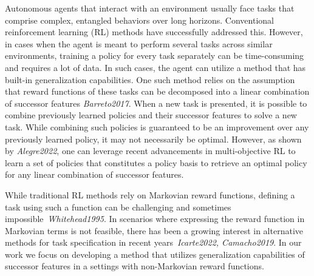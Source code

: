 Autonomous agents that interact with an environment usually face tasks  that comprise complex, entangled behaviors over long horizons. Conventional reinforcement learning (RL) methods have successfully addressed this.  However, in cases when the agent is meant to perform several tasks across similar environments, training a policy for every task separately can be time-consuming and requires a lot of data. In such cases, the agent can utilize a method that has built-in generalization capabilities. One such method relies on the assumption that reward functions of these tasks can be decomposed into a linear combination of successor features \textit{Barreto2017}. When a new task is presented, it is possible to combine previously learned policies and their successor features to solve a new task. %
While combining such policies is guaranteed to be an improvement over any previously learned policy, it may not necessarily be optimal. 
However, as shown by \textit{Alegre2022}, %
one can leverage recent advancements in multi-objective RL to learn a set of policies that constitutes a policy basis to retrieve an optimal policy for any linear combination of successor features. 

While traditional RL methods rely on Markovian reward functions, defining a task using such a function can be challenging and sometimes impossible~\textit{Whitehead1995}. In scenarios where expressing the reward function in Markovian terms is not feasible, there has been a growing interest in alternative methods for task specification in recent years~\textit{Icarte2022, Camacho2019}. 
In our work we focus on developing a method that utilizes generalization capabilities of successor features in a settings with non-Markovian reward functions.


